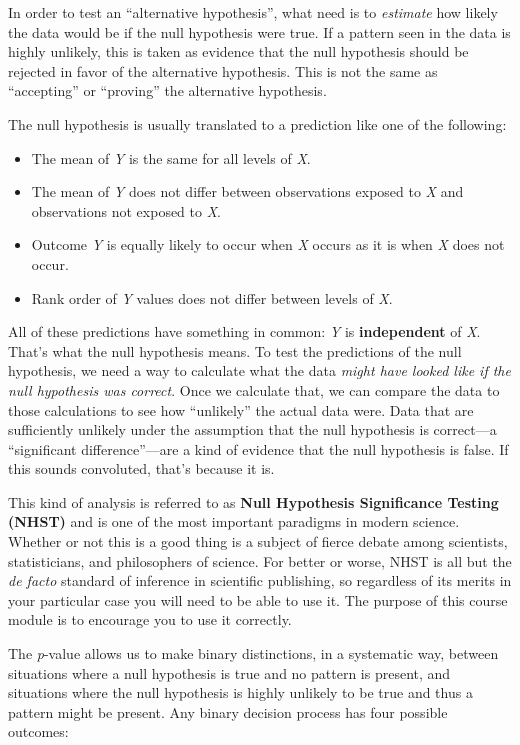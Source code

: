 \documentclass[
  13,
  letterpaper,
]{report}
\begin{document}
In order to test an ``alternative hypothesis'', what need is to
\emph{estimate} how likely the data would be if the null hypothesis were
true. If a pattern seen in the data is highly unlikely, this is taken as
evidence that the null hypothesis should be rejected in favor of the
alternative hypothesis. This is not the same as ``accepting'' or
``proving'' the alternative hypothesis.

The null hypothesis is usually translated to a prediction like one of
the following:

\begin{itemize}
\item
  The mean of \emph{Y} is the same for all levels of \emph{X}.
\item
  The mean of \emph{Y} does not differ between observations exposed to
  \emph{X} and observations not exposed to \emph{X}.
\item
  Outcome \emph{Y} is equally likely to occur when \emph{X} occurs as it
  is when \emph{X} does not occur.
\item
  Rank order of \emph{Y} values does not differ between levels of
  \emph{X}.
\end{itemize}

All of these predictions have something in common: \emph{Y} is
\textbf{independent} of \emph{X}. That's what the null hypothesis means.
To test the predictions of the null hypothesis, we need a way to
calculate what the data \emph{might have looked like if the null
hypothesis was correct}. Once we calculate that, we can compare the data
to those calculations to see how ``unlikely'' the actual data were. Data
that are sufficiently unlikely under the assumption that the null
hypothesis is correct---a ``significant difference''---are a kind of
evidence that the null hypothesis is false. If this sounds convoluted,
that's because it is.

This kind of analysis is referred to as \textbf{Null Hypothesis
Significance Testing (NHST)} and is one of the most important paradigms
in modern science. Whether or not this is a good thing is a subject of
fierce debate among scientists, statisticians, and philosophers of
science. For better or worse, NHST is all but the \emph{de facto}
standard of inference in scientific publishing, so regardless of its
merits in your particular case you will need to be able to use it. The
purpose of this course module is to encourage you to use it correctly.

The \emph{p}-value allows us to make binary distinctions, in a
systematic way, between situations where a null hypothesis is true and
no pattern is present, and situations where the null hypothesis is
highly unlikely to be true and thus a pattern might be present. Any
binary decision process has four possible outcomes:
\end{document}

